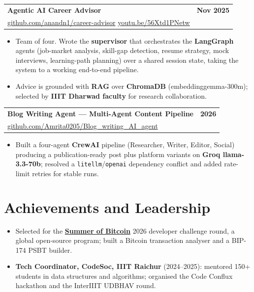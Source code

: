 \documentclass[letterpaper,10pt]{article}
\makeatletter
\newcommand{\sep}{\hspace{5pt}{\color{accent}|}\hspace{5pt}}
\newcommand{\lnk}[2]{\href{#1}{\color{linkgray}#2}}
\newcommand{\project}[3]{%
  \begin{tabularx}{\linewidth}{@{}X r@{}}
    \textbf{#1} & \textbf{#2}\\
    \small #3 & \\
  \end{tabularx}\vspace{-1pt}}
\newenvironment{bullets}{\begin{itemize}\small}{\end{itemize}\vspace{1pt}}
\makeatother
\begin{document}
\project{Agentic AI Career Advisor}{Nov 2025}{\lnk{https://github.com/anandn1/career-advisor}{github.com/anandn1/career-advisor} \sep \lnk{https://youtu.be/56Xtd1PNetw}{youtu.be/56Xtd1PNetw}}
\begin{bullets}
  \item Team of four. Wrote the \textbf{supervisor} that orchestrates the \textbf{LangGraph} agents (job-market analysis, skill-gap detection, resume strategy, mock interviews, learning-path planning) over a shared session state, taking the system to a working end-to-end pipeline.
  \item Advice is grounded with \textbf{RAG} over \textbf{ChromaDB} (embeddinggemma-300m); selected by \textbf{IIIT Dharwad faculty} for research collaboration.
\end{bullets}

\project{Blog Writing Agent --- Multi-Agent Content Pipeline}{2026}{\lnk{https://github.com/Amrita0205/Blog_writing_AI_agent}{github.com/Amrita0205/Blog\_writing\_AI\_agent}}
\begin{bullets}
  \item Built a four-agent \textbf{CrewAI} pipeline (Researcher, Writer, Editor, Social) producing a publication-ready post plus platform variants on \textbf{Groq llama-3.3-70b}; resolved a \texttt{litellm}/\texttt{openai} dependency conflict and added rate-limit retries for stable runs.
\end{bullets}

\section{Achievements and Leadership}
\begin{itemize}[label=\textbullet,leftmargin=0.15in]\small
  \item Selected for the \lnk{https://www.summerofbitcoin.org/}{\textbf{Summer of Bitcoin}} 2026 developer challenge round, a global open-source program; built a Bitcoin transaction analyser and a BIP-174 PSBT builder.
  \item \textbf{Tech Coordinator, CodeSoc, IIIT Raichur} (2024--2025): mentored 150+ students in data structures and algorithms; organised the Code Conflux hackathon and the InterIIIT UDBHAV round.
\end{itemize}

\end{document}
